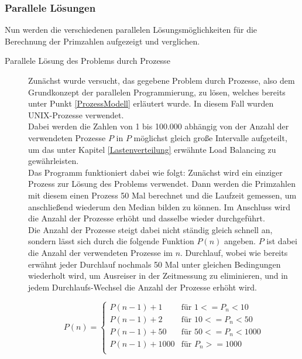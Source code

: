 			\subsubsection{Parallele Lösungen}
				Nun werden die verschiedenen parallelen Lösungsmöglichkeiten für die Berechnung der Primzahlen aufgezeigt und verglichen.\\
				
				\begin{description}
					
					\item[Parallele Lösung des Problems durch Prozesse]
					
						Zunächst wurde versucht, das gegebene Problem durch Prozesse, also dem Grundkonzept der parallelen Programmierung, zu lösen, welches bereits unter Punkt \ref{ProzessModell} erläutert wurde. In diesem Fall wurden UNIX-Prozesse verwendet.\\
						Dabei werden die Zahlen von 1 bis 100.000 abhängig von der Anzahl der verwendeten Prozesse $P$ in $P$ möglichst gleich große Intervalle aufgeteilt, um das unter Kapitel \ref{Lastenverteilung} erwähnte Load Balancing zu gewährleisten.\\
						Das Programm funktioniert dabei wie folgt: Zunächst wird ein einziger Prozess zur Lösung des Problems verwendet. Dann werden die Primzahlen mit diesem einen Prozess 50 Mal berechnet und die Laufzeit gemessen, um anschließend wiederum den Median bilden zu können. Im Anschluss wird die Anzahl der Prozesse erhöht und dasselbe wieder durchgeführt.\\
						Die Anzahl der Prozesse steigt dabei nicht ständig gleich schnell an, sondern lässt sich durch die folgende Funktion $P(n)$ angeben. $P$ ist dabei die Anzahl der verwendeten Prozesse im $n$. Durchlauf, wobei wie bereits erwähnt jeder Durchlauf nochmals 50 Mal unter gleichen Bedingungen wiederholt wird, um Ausreiser in der Zeitmessung zu eliminieren, und in jedem Durchlaufs-Wechsel die Anzahl der Prozesse erhöht wird.
						
						\begin{equation}
							P(n) =
							\begin{cases}
								P(n - 1) + 1 & \text{für } 1 <= P_n < 10\\
								P(n - 1) + 2 & \text{für } 10 <= P_n < 50\\
								P(n - 1) + 50 & \text{für } 50 <= P_n < 1000\\
								P(n - 1) + 1000 & \text{für } P_n >= 1000\\
							\end{cases}
						\end{equation}
						

\end{description}
